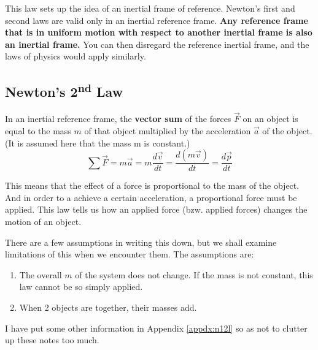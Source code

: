 \documentclass[11pt]{article}
\numberwithin{equation}{section}
\begin{document}
		This law sets up the idea of an inertial frame of reference. Newton's first and second laws are valid only in an inertial reference frame. \textbf{Any reference frame that is in uniform motion with respect to another inertial frame is also an inertial frame.} You can then disregard the reference inertial frame, and the laws of physics would apply similarly. 
		
		\pagebreak
		
		\subsection{Newton's 2\textsuperscript{nd} Law}
		\begin{shaded}
			In an inertial reference frame, the \textbf{vector sum} of the forces $\vec{F}$ on an object is equal to the mass $m$ of that object multiplied by the acceleration $\vec{a}$ of the object. (It is assumed here that the mass m is constant.)
			\begin{equation}
				\sum\vec{F} = m\vec{a} = m\frac{d\vec{v}}{dt} = \frac{d(m\vec{v})}{dt} = \frac{d\vec{p}}{dt}
			\end{equation}
		\end{shaded}
	
		This means that the effect of a force is proportional to the mass of the object. And in order to a achieve a certain acceleration, a proportional force must be applied. This law tells us how an applied force (bzw. applied forces) changes the motion of an object.
	
		There are a few assumptions in writing this down, but we shall examine limitations of this when we encounter them. The assumptions are:
		\begin{enumerate}
			\item The overall $m$ of the system does not change. If the mass is not constant, this law cannot be so simply applied.
			\item When 2 objects are together, their masses add.
		\end{enumerate}
		
		I have put some other information in Appendix \ref{appdx:n12l} so as not to clutter up these notes too much.
		
\end{document}

